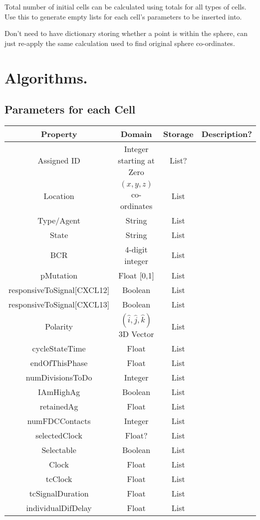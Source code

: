 \documentclass[english]{article}
\begin{document}
Total number of initial cells can be calculated using totals for all types of cells. Use this to generate empty lists for each cell's parameters to be inserted into. 

Don't need to have dictionary storing whether a point is within the sphere, can just re-apply the same calculation used to find original sphere co-ordinates. 

\section{Algorithms.}

\subsection{Parameters for each Cell}
\begin{center}

\begin{tabular}{|c|c|c|c|}
\hline 
Property & Domain & Storage & Description?\tabularnewline
\hline 
\hline 
Assigned ID & Integer starting at Zero & List? & \tabularnewline
\hline 
Location & $(x,y,z)$ co-ordinates & List & \tabularnewline
\hline
Type/Agent & String & List & \tabularnewline
\hline 
State & String & List & \tabularnewline
\hline 
BCR & 4-digit integer & List & \tabularnewline
\hline 
pMutation & Float [0,1] & List & \tabularnewline
\hline 
responsiveToSignal{[}CXCL12{]} & Boolean & List & \tabularnewline
\hline 
responsiveToSignal{[}CXCL13{]} & Boolean & List & \tabularnewline
\hline 
Polarity & $(\hat{i},\hat{j},\hat{k})$ 3D Vector  & List & \tabularnewline
\hline 
cycleStateTime & Float & List & \tabularnewline
\hline 
endOfThisPhase & Float & List & \tabularnewline
\hline 
numDivisionsToDo & Integer & List & \tabularnewline
\hline 
IAmHighAg & Boolean & List & \tabularnewline
\hline 
retainedAg & Float & List & \tabularnewline
\hline 
numFDCContacts & Integer & List & \tabularnewline
\hline 
selectedClock & Float? & List & \tabularnewline
\hline 
Selectable & Boolean & List & \tabularnewline
\hline 
Clock & Float & List & \tabularnewline
\hline 
tcClock & Float & List & \tabularnewline
\hline 
tcSignalDuration & Float & List & \tabularnewline
\hline 
individualDifDelay & Float & List & \tabularnewline
\hline 
\end{tabular}

\end{center}
\end{document}
